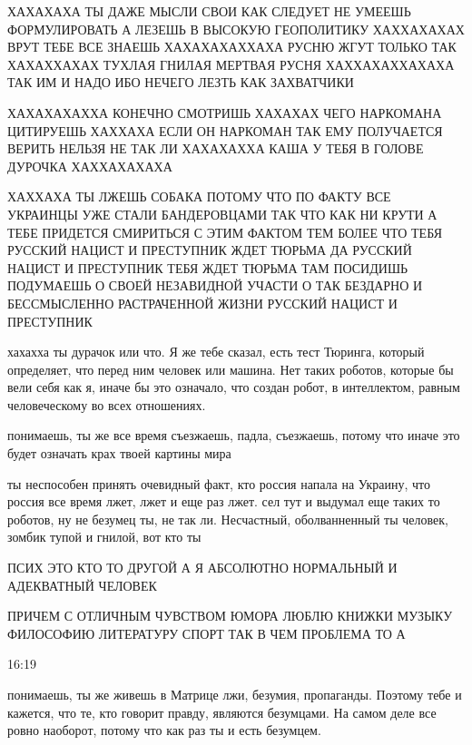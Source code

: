 ХАХАХАХА ТЫ ДАЖЕ МЫСЛИ СВОИ КАК СЛЕДУЕТ НЕ УМЕЕШЬ ФОРМУЛИРОВАТЬ А ЛЕЗЕШЬ В
ВЫСОКУЮ ГЕОПОЛИТИКУ ХАХХАХАХАХ ВРУТ ТЕБЕ ВСЕ ЗНАЕШЬ ХАХАХАХАХХАХА РУСНЮ ЖГУТ
ТОЛЬКО ТАК ХАХАХХАХАХ ТУХЛАЯ ГНИЛАЯ МЕРТВАЯ РУСНЯ ХАХХАХАХХАХАХА ТАК ИМ И НАДО
ИБО НЕЧЕГО ЛЕЗТЬ КАК ЗАХВАТЧИКИ

ХАХАХАХАХХА КОНЕЧНО СМОТРИШЬ ХАХАХАХ ЧЕГО НАРКОМАНА ЦИТИРУЕШЬ ХАХХАХА ЕСЛИ ОН
НАРКОМАН ТАК ЕМУ ПОЛУЧАЕТСЯ ВЕРИТЬ НЕЛЬЗЯ НЕ ТАК ЛИ ХАХАХАХХА КАША У ТЕБЯ В
ГОЛОВЕ ДУРОЧКА ХАХХАХАХАХА


ХАХХАХА ТЫ ЛЖЕШЬ СОБАКА ПОТОМУ ЧТО ПО ФАКТУ ВСЕ УКРАИНЦЫ УЖЕ СТАЛИ БАНДЕРОВЦАМИ
ТАК ЧТО КАК НИ КРУТИ А ТЕБЕ ПРИДЕТСЯ СМИРИТЬСЯ С ЭТИМ ФАКТОМ ТЕМ БОЛЕЕ ЧТО ТЕБЯ
РУССКИЙ НАЦИСТ И ПРЕСТУПНИК ЖДЕТ ТЮРЬМА ДА РУССКИЙ НАЦИСТ И ПРЕСТУПНИК ТЕБЯ
ЖДЕТ ТЮРЬМА ТАМ ПОСИДИШЬ ПОДУМАЕШЬ О СВОЕЙ НЕЗАВИДНОЙ УЧАСТИ О ТАК БЕЗДАРНО И
БЕССМЫСЛЕННО РАСТРАЧЕННОЙ ЖИЗНИ РУССКИЙ НАЦИСТ И ПРЕСТУПНИК

хахахха ты дурачок или что. Я же тебе сказал, есть тест Тюринга, который
определяет, что перед ним человек или машина. Нет таких роботов, которые бы
вели себя как я, иначе бы это означало, что создан робот, в интеллектом, равным
человеческому во всех отношениях.

понимаешь, ты же все время съезжаешь, падла, съезжаешь, потому что иначе это
будет означать крах твоей картины мира

ты неспособен принять очевидный факт, кто россия напала на Украину, что россия
все время лжет, лжет и еще раз лжет. сел тут и выдумал еще таких то роботов, ну
не безумец ты, не так ли. Несчастный, оболванненный ты человек, зомбик тупой и
гнилой, вот кто ты

ПСИХ ЭТО КТО ТО ДРУГОЙ А Я АБСОЛЮТНО НОРМАЛЬНЫЙ И АДЕКВАТНЫЙ ЧЕЛОВЕК

ПРИЧЕМ С ОТЛИЧНЫМ ЧУВСТВОМ ЮМОРА ЛЮБЛЮ КНИЖКИ МУЗЫКУ ФИЛОСОФИЮ ЛИТЕРАТУРУ СПОРТ
ТАК В ЧЕМ ПРОБЛЕМА ТО А

16:19

понимаешь, ты же живешь в Матрице лжи, безумия, пропаганды. Поэтому тебе и
кажется, что те, кто говорит правду, являются безумцами. На самом деле все
ровно наоборот, потому что как раз ты и есть безумцем.


